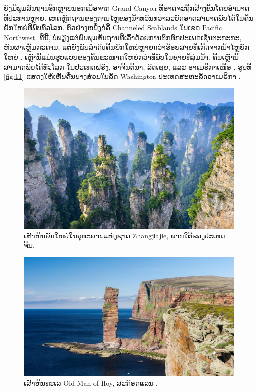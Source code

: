 \documentclass[10pt,twocolumn,letterpaper]{article}
\begin{document}
ຍັງມີພູມສັນຖານອີກຫຼາຍນອກເນືອຈາກ Grand Canyon ທີ່ອາດຈະຖືກສ້າງຂຶ້ນໂດຍອໍານາດທີ່ປະທານຫຼາຍ. ເຫດຫຼັກຖານຂອງການໄຫຼຂອງນ້ໍາທວົນທວາລະບົດອາດສາມາດພົບໄດ້ໃນຄື່ນຍັກໃຫຍ່ທີ່ພົບທົ່ວໂລກ. ຕົວຢ່າງຫນຶ່ງກໍຄື Channeled Scablands ໃນເຂດ Pacific Northwest. ທີ່ນີ້, ບໍ່ພຽງແຕ່ພົບພູມສັນຖານທີ່ເວົ້າດ້ວຍການຕົກທົກປະເພດເຊັ່ນຕະກະກະ, ຫົນຜາເຫຼັ້ມກະດານ, ແຕ່ຍັງພົບລຳດັບຄື່ນຍັກໃຫຍ່ຫຼາຍກວ່າຮ້ອຍສາຍທີ່ເກີດຈາກນ້ໍາໄຫຼຍັກໃຫຍ່ \cite{78,79}. ເຫຼົ່ານີ້ແມ່ນຮູບແບບຂອງຄື່ນຂະໜາດໃຫຍ່ກວ່າທີ່ພົບໃນຊາຍທີ່ລຸ່ມນ້ໍາ. ຄື່ນເຫຼົ່ານີ້ສາມາດພົບໄດ້ທົ່ວໂລກ ໃນປະເທດຝຣັ່ງ, ອາຈີນຕີນາ, ລັດເຊຍ, ແລະ ອາເມຣິກາເໜືອ \cite{81}. ຮູບທີ່ \ref{fig:11} ແສດງໃຫ້ເຫັັນຄື່ນບາງສ່ວນໃນລັດ Washington ປະເທດສະຫະລັດອາເມຣິກາ \cite{80}.

\begin{figure}[b]
\begin{center}
   \includegraphics[width=1\linewidth]{zhangjiajie.jpg}
\end{center}
   \caption{ເສົາຫິນຍັກໃຫຍ່ໃນອຸທະຍານແຫ່ງຊາດ Zhangjiajie, ພາກໃຕ້ຂອງປະເທດຈີນ.}
\label{fig:12}
\label{fig:onecol}
\end{figure}

\begin{figure}[b]
\begin{center}
\includegraphics[width=1\linewidth]{hoy.jpg}
\end{center}
   \caption{ເສົາຫີນທະເລ Old Man of Hoy, ສະກັອດແລນ \cite{83}.}
\label{fig:13}
\label{fig:onecol}
\end{figure}
\end{document}
